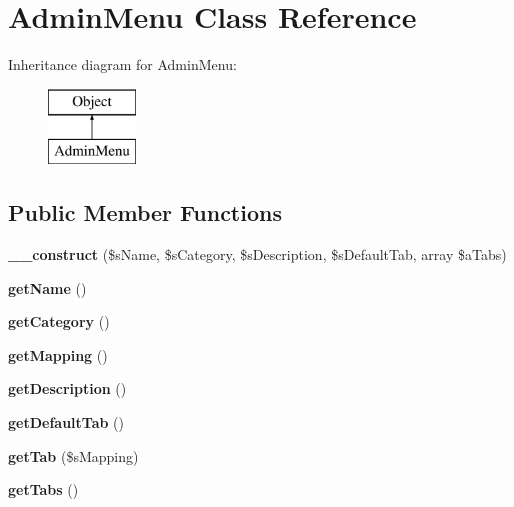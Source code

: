 \hypertarget{class_admin_menu}{\section{Admin\-Menu Class Reference}
\label{class_admin_menu}
}
Inheritance diagram for Admin\-Menu\-:\begin{figure}[H]
\begin{center}
\leavevmode
\includegraphics[height=2.000000cm]{class_admin_menu}
\end{center}
\end{figure}
\subsection*{Public Member Functions}
\begin{DoxyCompactItemize}
\item 
\hypertarget{class_admin_menu_a0cc437df56378314db7922b1aa3a9153}{{\bfseries \-\_\-\-\_\-construct} (\$s\-Name, \$s\-Category, \$s\-Description, \$s\-Default\-Tab, array \$a\-Tabs)}\label{class_admin_menu_a0cc437df56378314db7922b1aa3a9153}

\item 
\hypertarget{class_admin_menu_ab72ea59ea03728c9500701539a081f2f}{{\bfseries get\-Name} ()}\label{class_admin_menu_ab72ea59ea03728c9500701539a081f2f}

\item 
\hypertarget{class_admin_menu_a79ed39bc0f855b152d2c6ef519aba761}{{\bfseries get\-Category} ()}\label{class_admin_menu_a79ed39bc0f855b152d2c6ef519aba761}

\item 
\hypertarget{class_admin_menu_aa79a4b95295fb10e96c49346cb5c9693}{{\bfseries get\-Mapping} ()}\label{class_admin_menu_aa79a4b95295fb10e96c49346cb5c9693}

\item 
\hypertarget{class_admin_menu_ad1cd13c8c9ce65a68e2662f2a9671623}{{\bfseries get\-Description} ()}\label{class_admin_menu_ad1cd13c8c9ce65a68e2662f2a9671623}

\item 
\hypertarget{class_admin_menu_a90c8e8be95b019e04d0c7cf9ebd590bd}{{\bfseries get\-Default\-Tab} ()}\label{class_admin_menu_a90c8e8be95b019e04d0c7cf9ebd590bd}

\item 
\hypertarget{class_admin_menu_afae716d05aa6fcfbd0767b61a5d5d277}{{\bfseries get\-Tab} (\$s\-Mapping)}\label{class_admin_menu_afae716d05aa6fcfbd0767b61a5d5d277}

\item 
\hypertarget{class_admin_menu_ab12f0503c256a3b949d567181c235b26}{{\bfseries get\-Tabs} ()}\label{class_admin_menu_ab12f0503c256a3b949d567181c235b26}

\end{DoxyCompactItemize}
